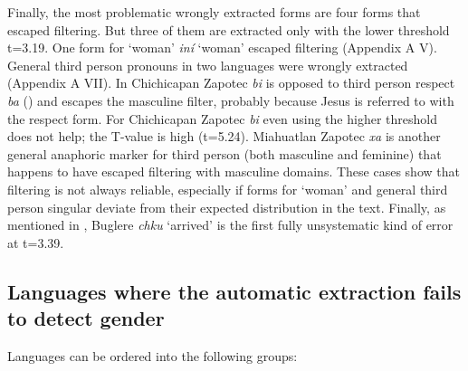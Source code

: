 \documentclass[output=collectionpaper]{langsci/langscibook}
\begin{document}
Finally, the most problematic wrongly extracted forms are four forms that escaped filtering. But three of them are extracted only with the lower threshold t=3.19. One form for ‘woman’  \textit{iní} ‘woman’ escaped filtering (Appendix A V). General third person pronouns in two  languages were wrongly extracted (Appendix A VII). In Chichicapan Zapotec \textit{bi} is opposed to third person respect \textit{ba} (\citealt{Benton1975}) and escapes the masculine filter, probably because Jesus is referred to with the respect form. For Chichicapan Zapotec \textit{bi} even using the higher threshold does not help; the T-value is high (t=5.24). Miahuatlan Zapotec \textit{xa\textquotesingle} is another general anaphoric marker for third person (both masculine and feminine) that happens to have escaped filtering with masculine domains. These cases show that filtering is not always reliable, especially if forms for ‘woman’ and general third person singular deviate from their expected distribution in the text. Finally, as mentioned in , Buglere \textit{chku} ‘arrived’ is the first fully unsystematic kind of error at t=3.39.

\subsection{Languages where the automatic extraction fails to detect gender}
\label{sec:BW:3.5}

Languages  can be ordered into the following groups:
\end{document}
